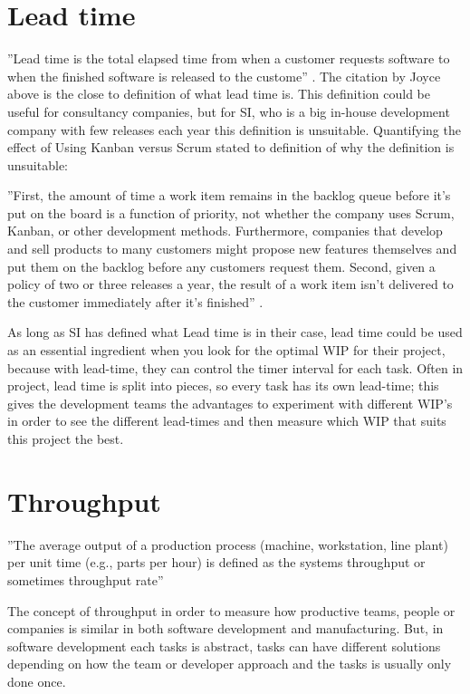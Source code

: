 \documentclass[UKenglish]{ifimaster}  %
\begin{document}
\section {Lead time}
''Lead time is the total elapsed time from when a customer requests software to when the finished software is released to the custome'' \parencite{Joyce}.
The citation by Joyce above is the close to definition of what lead time is. This definition could be useful for consultancy companies, but for SI, who is a big in-house development company with few releases each year this definition is unsuitable. Quantifying the effect of Using Kanban versus Scrum stated to definition of why the definition is unsuitable: 

''First, the amount of time a work item remains in the backlog queue before it's put on the board is a function of priority, not whether the company uses Scrum, Kanban, or other development methods. Furthermore, companies that develop and sell products to many customers might propose new features themselves and put them on the backlog before any customers request them. Second, given a policy of two or three releases a year, the result of a work item isn't delivered to the customer immediately after it's finished'' .
\parencite{Dag}

As long as SI has defined what Lead time is in their case, lead time could be used as an essential ingredient when you look for the optimal WIP for their project, because with lead-time, they can control the timer interval for each task. Often in project, lead time is split into pieces, so every task has its own lead-time; this gives the development teams the advantages to experiment with different WIP's in order to see the different lead-times and then measure which WIP that suits this project the best. 

\section{Throughput}
''The average output of a production process (machine, workstation, line plant) per unit time (e.g., parts per hour) is defined as the systems throughput or sometimes throughput rate'' \parencite{Adams}

The concept of throughput in order to measure how productive teams, people or companies is similar in both software development and manufacturing. But, in software development each tasks is abstract, tasks can have different solutions depending on how the team or developer approach and the tasks is usually only done once.
\end{document}

